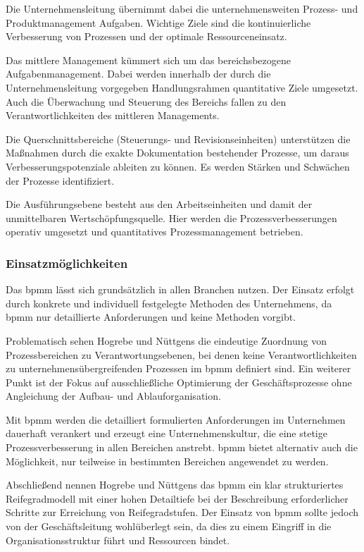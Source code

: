 Die Unternehmensleitung übernimmt dabei die unternehmensweiten Prozess- und Produktmanagement Aufgaben. Wichtige Ziele sind die kontinuierliche Verbesserung von Prozessen und der optimale Ressourceneinsatz. \par
Das mittlere Management kümmert sich um das bereichsbezogene Aufgabenmanagement. Dabei werden innerhalb der durch die Unternehmensleitung vorgegeben Handlungsrahmen quantitative Ziele umgesetzt. Auch die Überwachung und Steuerung des Bereichs fallen zu den Verantwortlichkeiten des mittleren Managements.\par
Die Querschnittsbereiche (Steuerungs- und Revisionseinheiten) unterstützen die Maßnahmen durch die exakte Dokumentation bestehender Prozesse, um daraus Verbesserungspotenziale ableiten zu können. Es werden Stärken und Schwächen der Prozesse identifiziert. \par
Die Ausführungsebene besteht aus den Arbeitseinheiten und damit der unmittelbaren Wertschöpfungsquelle. Hier werden die Prozessverbesserungen operativ umgesetzt und quantitatives Prozessmanagement betrieben.

\subsubsection{Einsatzmöglichkeiten}

Das \acs{bpmm} lässt sich grundsätzlich in allen Branchen nutzen. Der Einsatz erfolgt durch konkrete und individuell festgelegte Methoden des Unternehmens, da \acs{bpmm} nur detaillierte Anforderungen und keine Methoden vorgibt.\par
Problematisch sehen Hogrebe und Nüttgens die eindeutige Zuordnung von Prozessbereichen zu Verantwortungsebenen, bei denen keine Verantwortlichkeiten zu unternehmensübergreifenden Prozessen im \acs{bpmm} definiert sind. Ein weiterer Punkt ist der Fokus auf ausschließliche Optimierung der Geschäftsprozesse ohne Angleichung der Aufbau- und Ablauforganisation.\par
Mit \acs{bpmm} werden die detailliert formulierten Anforderungen im Unternehmen dauerhaft verankert und erzeugt eine Unternehmenskultur, die eine stetige Prozessverbesserung in allen Bereichen anstrebt. \acs{bpmm} bietet alternativ auch die Möglichkeit, nur teilweise in bestimmten Bereichen angewendet zu werden.\par
Abschließend nennen Hogrebe und Nüttgens das \acs{bpmm} ein klar strukturiertes Reifegradmodell mit einer hohen Detailtiefe bei der Beschreibung erforderlicher Schritte zur Erreichung von Reifegradstufen. Der Einsatz von \acs{bpmm} sollte jedoch von der Geschäftsleitung wohlüberlegt sein, da dies zu einem Eingriff in die Organisationsstruktur führt und Ressourcen bindet.
